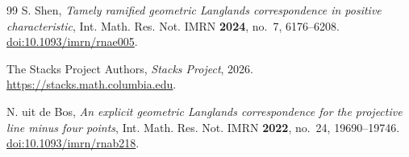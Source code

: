 \begin{thebibliography}{99}
S. Shen, \emph{Tamely ramified geometric Langlands correspondence in
positive characteristic}, Int. Math. Res. Not. IMRN \textbf{2024},
no.~7, 6176--6208.
\href{https://doi.org/10.1093/imrn/rnae005}{doi:10.1093/imrn/rnae005}.

The Stacks Project Authors, \emph{Stacks Project}, 2026.
\url{https://stacks.math.columbia.edu}.

N. uit de Bos, \emph{An explicit geometric Langlands correspondence for
the projective line minus four points}, Int. Math. Res. Not. IMRN
\textbf{2022}, no.~24, 19690--19746.
\href{https://doi.org/10.1093/imrn/rnab218}{doi:10.1093/imrn/rnab218}.

\end{thebibliography}

